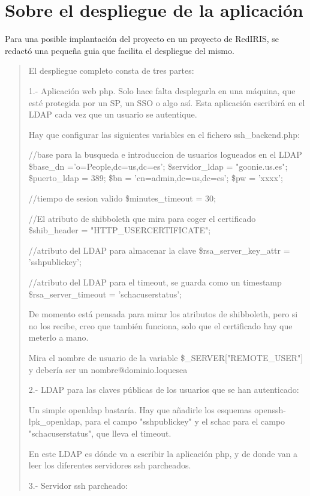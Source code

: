 \section{Sobre el despliegue de la aplicación}


    Para una posible implantación del proyecto en un proyecto de RedIRIS,
    se redactó una pequeña guia que facilita el despliegue del mismo.

    \begin{quote}
El despliegue completo consta de tres partes:

1.- Aplicación web php. Solo hace falta desplegarla en una máquina, que
esté protegida por un SP, un SSO o algo así. Esta aplicación escribirá
en el LDAP cada vez que un usuario se autentique.

Hay que configurar las siguientes variables en el fichero
ssh\_backend.php:

//base para la busqueda e introduccion de usuarios logueados en el LDAP
\$base\_dn ='o=People,dc=us,dc=es';
\$servidor\_ldap = "goonie.us.es";
\$puerto\_ldap = 389;
\$bn = 'cn=admin,dc=us,dc=es';
\$pw = 'xxxx';

//tiempo de sesion valido
\$minutes\_timeout = 30;

//El atributo de shibboleth que mira para coger el certificado
\$shib\_header = "HTTP\_USERCERTIFICATE";

//atributo del LDAP para almacenar la clave
\$rsa\_server\_key\_attr = 'sshpublickey';

//atributo del LDAP para el timeout, se guarda como un timestamp
\$rsa\_server\_timeout = 'schacuserstatus';

De momento está pensada para mirar los atributos de shibboleth, pero si
no los recibe, creo que también funciona, solo que el certificado hay
que meterlo a mano.

Mira el nombre de usuario de la variable \$\_SERVER["REMOTE\_USER"] y
debería ser un nombre@dominio.loquesea

2.- LDAP para las claves públicas de los usuarios que se han
autenticado:

Un simple openldap bastaría. Hay que añadirle los esquemas
openssh-lpk\_openldap, para el campo "sshpublickey" y el schac para el
campo "schacuserstatus", que lleva el timeout.

En este LDAP es dónde va a escribir la aplicación php, y de donde van a
leer los diferentes servidores ssh parcheados.

3.- Servidor ssh parcheado:


\end{quote}
